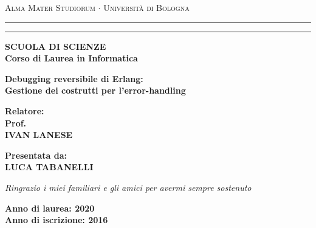 \documentclass[a4paper,12pt]{article}
\begin{document}
\begin{titlepage}
\begin{center}
{{\Large{\textsc{Alma Mater Studiorum $\cdot$ Universit\`a di
Bologna}}}} \rule[0.1cm]{15.8cm}{0.1mm}
\rule[0.5cm]{15.8cm}{0.6mm}
{\small{\bf SCUOLA DI SCIENZE\\
Corso di Laurea in Informatica}}
\end{center}
\vspace{15mm}
\begin{center}
{\LARGE{\bf Debugging reversibile di Erlang:}}\\
\vspace{3mm}
{\LARGE{\bf Gestione dei costrutti per l'error-handling}}\\
\end{center}
\vspace{40mm}
\par
\noindent
\begin{minipage}[t]{0.47\textwidth}
{\large{\bf Relatore:\\
Prof.\\
IVAN LANESE}}
\end{minipage}
\hfill
\begin{minipage}[t]{0.47\textwidth}\raggedleft
{\large{\bf Presentata da:\\
LUCA TABANELLI}}
\end{minipage}
\hfill
\begin{flushright}
\begin{minipage}[t]{0.47\textwidth}\raggedright
{\large{\it Ringrazio i miei familiari e gli amici per avermi sempre sostenuto}}
\end{minipage}
\end{flushright}
\vspace{20mm}
\begin{center}
{\large{\bf Anno di laurea: 2020\\%
Anno di iscrizione: 2016 }}%
\end{center}
\end{titlepage}
\tableofcontents
\clearpage




\clearpage
\printbibliography
\end{document}
